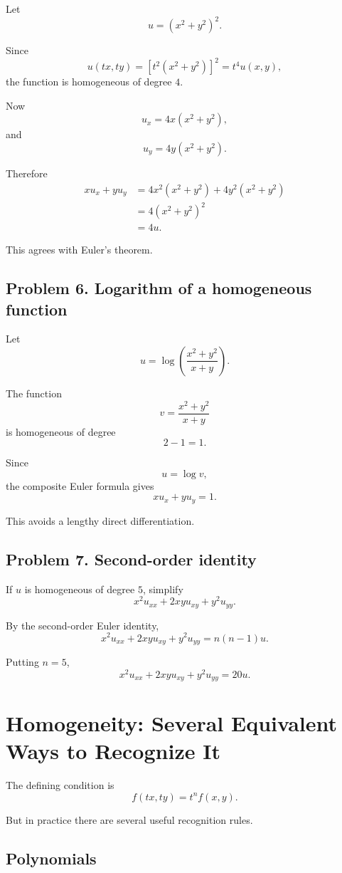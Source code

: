 \documentclass[11pt,oneside]{book}
\theoremstyle{studentthm}
\theoremstyle{definition}
\begin{document}
Let
\[
u=(x^2+y^2)^2.
\]

Since
\[
u(tx,ty)
=
[t^2(x^2+y^2)]^2
=
t^4u(x,y),
\]
the function is homogeneous of degree \(4\).

Now
\[
u_x
=
4x(x^2+y^2),
\]
and
\[
u_y
=
4y(x^2+y^2).
\]

Therefore
\[
\begin{aligned}
xu_x+yu_y
&=
4x^2(x^2+y^2)
+
4y^2(x^2+y^2)\\
&=
4(x^2+y^2)^2\\
&=
4u.
\end{aligned}
\]

This agrees with Euler's theorem.

\subsection*{Problem 6. Logarithm of a homogeneous function}

Let
\[
u
=
\log\left(\frac{x^2+y^2}{x+y}\right).
\]

The function
\[
v=
\frac{x^2+y^2}{x+y}
\]
is homogeneous of degree
\[
2-1=1.
\]

Since
\[
u=\log v,
\]
the composite Euler formula gives
\[
xu_x+yu_y=1.
\]

This avoids a lengthy direct differentiation.

\subsection*{Problem 7. Second-order identity}

If \(u\) is homogeneous of degree \(5\), simplify
\[
x^2u_{xx}+2xyu_{xy}+y^2u_{yy}.
\]

By the second-order Euler identity,
\[
x^2u_{xx}+2xyu_{xy}+y^2u_{yy}
=
n(n-1)u.
\]

Putting \(n=5\),
\[
x^2u_{xx}+2xyu_{xy}+y^2u_{yy}
=
20u.
\]



\section{Homogeneity: Several Equivalent Ways to Recognize It}

The defining condition is
\[
f(tx,ty)=t^nf(x,y).
\]

But in practice there are several useful recognition rules.

\subsection*{Polynomials}
\end{document}

